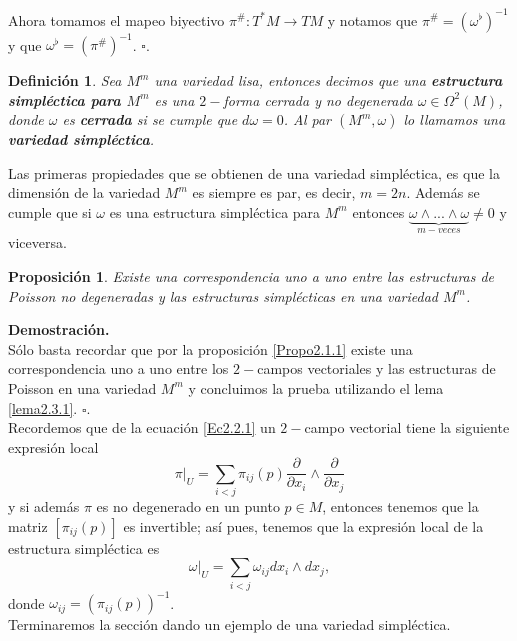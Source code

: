 \documentclass[a4paper,10pt]{book}
\newtheorem{propo}{Proposici\'on}[chapter]
\newtheorem{definicion}{Definici\'on}[chapter]
\begin{document}
Ahora tomamos el mapeo biyectivo $\pi^{\#}:T^{*}M\to TM$ y notamos que $\pi^{\#}=(\omega^{\flat})^{-1}$ y que $\omega^{\flat}=(\pi^{\#})^{-1}$.  \hfill $\square$.

\begin{definicion}\label{DefSimp}
Sea $M^{m}$ una variedad lisa, entonces decimos que una {\bfseries estructura simpl\'ectica para $M^{m}$} es una $2-$forma cerrada y no degenerada $\omega\in\Omega^{2}(M)$, donde $\omega$ es {\bfseries cerrada} si se cumple que $d\omega=0$. Al par $(M^{m}, \omega)$ lo llamamos una {\bfseries variedad simpl\'ectica}.
\end{definicion}

Las primeras propiedades que se obtienen de una variedad simpl\'ectica, es que la dimensi\'on de la variedad $M^{m}$ es siempre es par, es decir, $m=2n$. Adem\'as se cumple que si $\omega$ es una estructura simpl\'ectica para $M^{m}$ entonces $\underbrace{\omega\wedge...\wedge\omega}_{m-veces}\neq0$ y viceversa.

\begin{propo}\label{propo2.3.1}
Existe una correspondencia uno a uno entre las estructuras de Poisson no degeneradas y las estructuras simpl\'ecticas en una variedad $M^{m}$.   
\end{propo}

{\bfseries Demostraci\'on.}\\
S\'olo basta recordar que por la proposici\'on \ref{Propo2.1.1} existe una correspondencia uno a uno entre los $2-$campos vectoriales y las estructuras de Poisson en una variedad $M^{m}$ y concluimos la prueba utilizando el lema \ref{lema2.3.1}. \hfill $\square$. \\ 

Recordemos que de la ecuaci\'on \ref{Ec2.2.1} un $2-$campo vectorial tiene la siguiente expresi\'on local 
$$\pi|_{U} = \sum_{i<j}\pi_{ij}(p)\frac{\partial}{\partial x_{i}}\wedge\frac{\partial}{\partial x_{j}}$$      
y si adem\'as $\pi$ es no degenerado en un punto $p\in M$, entonces tenemos que la matriz $[\pi_{ij}(p)]$ es invertible; as\'i pues, tenemos que la expresi\'on local de la estructura simpl\'ectica es 
\begin{equation}
\omega|_{U}=\sum_{i<j}\omega_{ij}d x_{i}\wedge d x_{j},
\end{equation}
donde $\omega_{ij}=(\pi_{ij}(p))^{-1}$.\\

Terminaremos la secci\'on dando un ejemplo de una variedad simpl\'ectica.
\end{document}
